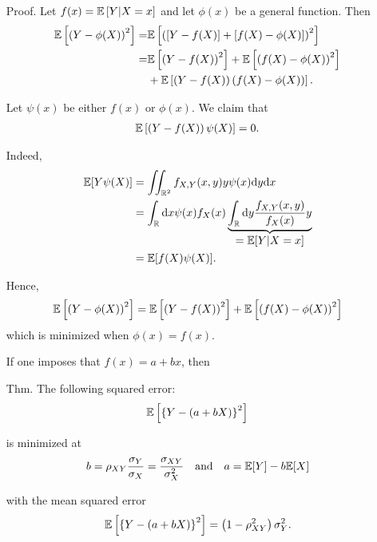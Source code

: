 \begin{frame}
\begin{enumerate}
\item[Proof.] Let $f(x)= \mathbb{E} \left[Y|X=x \right]$ and let $\phi(x)$ be a general function. Then
\begin{align*}
	\mathbb{E}\left[  \left(Y-\phi(X)\right)^2\right]= & \mathbb{E}\left[ \left([Y-f(X)]+ [f(X)-\phi(X)]\right)^2\right]                             \\
	                                         = & \mathbb{E}\left[ \left(Y-f(X)\right)^2\right] +\mathbb{E}\left[  \left(f(X)-\phi(X)\right)^2\right] \\
                                             & +\mathbb{E}\left[ \left(Y-f(X)\right) \left(f(X)-\phi(X)\right)\right].
\end{align*}
\item[] Let $\psi(x)$ be either $f(x)$ or $\phi(x)$. We claim that
\begin{align*}
\mathbb{E}\left[  \left(Y-f(X)\right) \psi(X)\right] =0.
\end{align*}
\item[] Indeed,
\begin{align*}
	\mathbb{E}[Y\psi(X)] & = \iint_{\mathbb{R}^2} f_{X,Y}(x,y)y\psi(x)\mathrm{d} y\mathrm{d} x \\
							 & = \int_{\mathbb{R}} \mathrm{d} x \psi(x) f_X(x) \underbrace{\int_{\mathbb{R}} \mathrm{d} y  \frac{f_{X,Y}(x,y)}{f_X(x)} y}_{\displaystyle = \mathbb{E}[Y|X=x] }\\
							 & = \mathbb{E}[f(X)\psi(X)].
\end{align*}
\item[] Hence,
\[
\mathbb{E}\left[  \left(Y-\phi(X)\right)^2\right]=
\mathbb{E}\left[  \left(Y-f(X)\right)^2\right] +\mathbb{E}\left[  \left(f(X)-\phi(X)\right)^2\right]
\]
which is minimized when $\phi(x)=f(x)$.\myEnd
\end{enumerate}
\end{frame}
\begin{frame}[fragile]

	\begin{enumerate}
		\item[] If one imposes that $f(x) = a+bx$, then
			\vfill
		\item[Thm.] The following squared error:
			\[
				\mathbb{E}\left[ \left\{ Y - \left( a+b X\right )\right\}^2  \right ]
			\]
		\item[] is minimized at
			\[
				b = \rho_{XY}\frac{\sigma_Y}{\sigma_X}=  \frac{\sigma_{XY}}{\sigma_X^2} \quad
				\text{and}\quad
				a = \mathbb{E}[Y] -b \mathbb{E}[X]
			\]
		\item[] with the mean squared error
			\[
				\mathbb{E}\left[ \left\{ Y - \left( a+b X\right )\right\}^2  \right ] = \left(1-\rho_{XY}^2 \right )\sigma_Y^2.
			\]
	\end{enumerate}
\end{frame}
